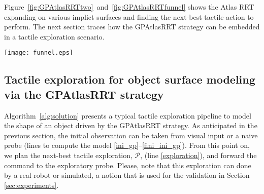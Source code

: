 Figure~\ref{fig:GPAtlasRRTtwo}~and~\ref{fig:GPAtlasRRTfunnel} shows the Atlas RRT expanding on various implict surfaces and finding the next-best tactile action to perform.
The next section traces how the GPAtlasRRT strategy can be embedded in a tactile exploration scenario.

\begin{figure*}[hbt]
    \centering
    \texttt{[image: funnel.eps]}
    \caption{ A funnel (left-upper corner) is first seen by a depth camera. The segmented 3D points are shown in blue in the left figure to form the training set $\mathcal{S}^0$. The predicted shape by the GP on this set is shown in the middle obtained via a marching cube sampling algorithm. However, the GPAtlasRRT strategy does not require the explicit form of the predicted surface, as shown in the right figure. It works with the implicit form to devise the next-best tactile exploration shown in brighter green.}
    \label{fig:GPAtlasRRTfunnel}
\end{figure*}

\subsection{Tactile exploration for object surface modeling via the GPAtlasRRT strategy}
\label{sec:gpatlasrrt_tactile_exploration}

Algorithm~\ref{alg:solution} presents a typical tactile exploration pipeline to model the shape of an object driven by the GPAtlasRRT strategy. As anticipated in the previous section, the initial observation can be taken from visual input or a naive probe (lines to compute the model \ref{ini_gp}--\ref{fini_ini_gp}). From this point on, we plan the next-best tactile exploration, $\mathcal{P}$, (line \ref{exploration}), and forward the command to the exploratory probe. Please, note that this exploration can done by a real robot or simulated, a notion that is used for the validation in Section \ref{sec:experiments}.

